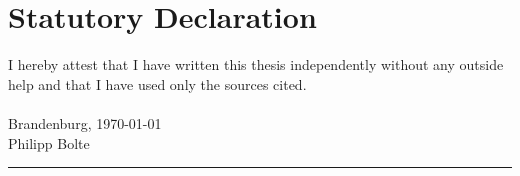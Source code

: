 
\usepackage[utf8]{inputenc}

\newcommand*{\mytitle}{Self-sovereign Identity: \\Development of an Implementation-based Evaluation Framework for Verifiable Credential SDKs} %
\newcommand*{\myinstitute}{Brandenburg University of Applied Sciences} %
\newcommand*{\myfaculty}{Department of Economics} %
\newcommand*{\myauthor}{Philipp Bolte} %
\newcommand*{\myreporttype}{Master's Thesis} %
\newcommand*{\mydate}{\today} %



	
\pagestyle{empty}

\newpage 					%
\thispagestyle{empty}
\quad 
\newpage
{}
 
\cleardoubleoddpage


\chapter*{Statutory Declaration}
I hereby attest that I have written this thesis independently without any outside help and that I have used only the sources cited. \\~\\
Brandenburg, \today\\[.6cm]
Philipp Bolte\\
\rule[0.5em]{20em}{0.5pt}



\tableofcontents			%
\listoffigures				%
\listoftables				%
\lstlistoflistings
